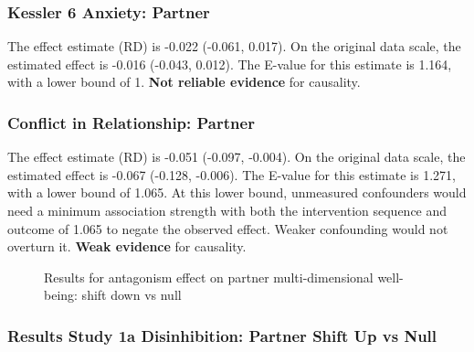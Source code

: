 \documentclass[
  singlecolumn]{article}
\begin{document}
\subsubsection{Kessler 6 Anxiety:
Partner}\label{kessler-6-anxiety-partner}

The effect estimate (RD) is -0.022 (-0.061, 0.017). On the original data
scale, the estimated effect is -0.016 (-0.043, 0.012). The E-value for
this estimate is 1.164, with a lower bound of 1. \textbf{Not reliable
evidence} for causality.

\subsubsection{Conflict in Relationship:
Partner}\label{conflict-in-relationship-partner}

The effect estimate (RD) is -0.051 (-0.097, -0.004). On the original
data scale, the estimated effect is -0.067 (-0.128, -0.006). The E-value
for this estimate is 1.271, with a lower bound of 1.065. At this lower
bound, unmeasured confounders would need a minimum association strength
with both the intervention sequence and outcome of 1.065 to negate the
observed effect. Weaker confounding would not overturn it. \textbf{Weak
evidence} for causality.

\begin{figure}


\caption{\label{fig-results-antagonism-partner-down}Results for
antagonism effect on partner multi-dimensional well-being: shift down vs
null}

\end{figure}%

\newpage{}

\subsubsection{Results Study 1a Disinhibition: Partner Shift Up vs
Null}\label{results-study-1a-disinhibition-partner-shift-up-vs-null}
\end{document}
